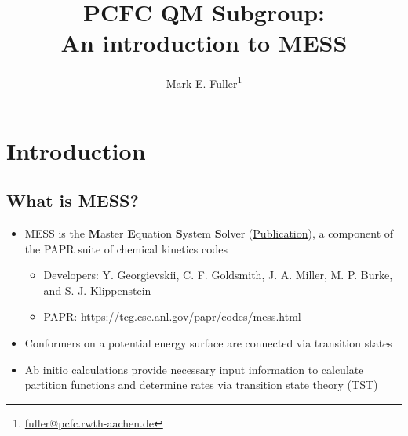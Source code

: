 \documentclass[a4paper,10pt]{article}
\title{PCFC QM Subgroup:\\An introduction to \textsc{MESS}}%
\author{Mark E. Fuller\footnote{\href{mailto:fuller@pcfc.rwth-aachen.de}{fuller@pcfc.rwth-aachen.de}}}
\begin{document}
\maketitle
\section{Introduction}
\subsection{What is \textsc{MESS}?}
  \begin{itemize}
   \item \textsc{MESS} is the \textbf{M}aster \textbf{E}quation \textbf{S}ystem \textbf{S}olver (\href{https://doi.org/10.1021/jp4060704}{Publication}\cite{Georgievskii.2013}), a component of the \textsc{PAPR} suite of chemical kinetics codes
    \begin{itemize}
     \item Developers: Y. Georgievskii, C. F. Goldsmith, J. A. Miller, M. P. Burke, and S. J. Klippenstein 
     \item \textsc{PAPR}: \url{https://tcg.cse.anl.gov/papr/codes/mess.html}
    \end{itemize}
   \item Conformers on a potential energy surface are connected via transition states
   \item Ab initio calculations provide necessary input information to calculate partition functions and determine rates via transition state theory (TST)
  \end{itemize}
\end{document}
